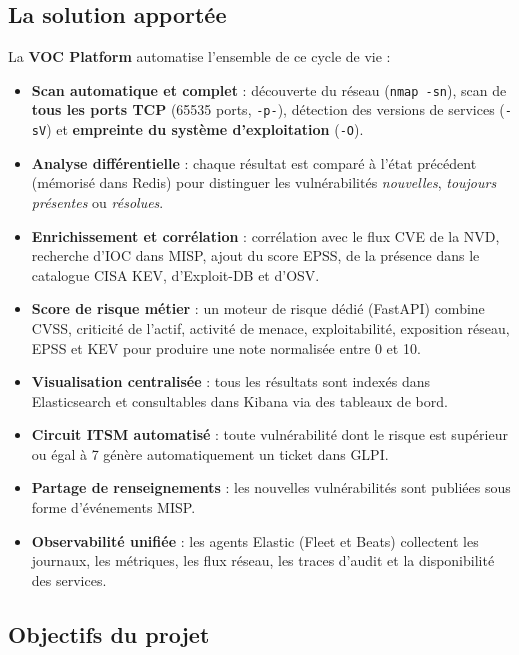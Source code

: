 \documentclass[11pt,a4paper]{article}
\begin{document}
\subsection{La solution apport\'ee}

La \textbf{VOC Platform} automatise l'ensemble de ce cycle de vie :

\begin{itemize}[leftmargin=1.6em]
  \item \textbf{Scan automatique et complet} : d\'ecouverte du r\'eseau
        (\texttt{nmap -sn}), scan de \textbf{tous les ports TCP} (65535 ports,
        \texttt{-p-}), d\'etection des versions de services (\texttt{-sV}) et
        \textbf{empreinte du syst\`eme d'exploitation} (\texttt{-O}).
  \item \textbf{Analyse diff\'erentielle} : chaque r\'esultat est compar\'e
        \`a l'\'etat pr\'ec\'edent (m\'emoris\'e dans Redis) pour distinguer
        les vuln\'erabilit\'es \emph{nouvelles}, \emph{toujours pr\'esentes}
        ou \emph{r\'esolues}.
  \item \textbf{Enrichissement et corr\'elation} : corr\'elation avec le flux
        CVE de la NVD, recherche d'IOC dans MISP, ajout du score EPSS, de la
        pr\'esence dans le catalogue CISA KEV, d'Exploit-DB et d'OSV.
  \item \textbf{Score de risque m\'etier} : un moteur de risque d\'edi\'e
        (FastAPI) combine CVSS, criticit\'e de l'actif, activit\'e de menace,
        exploitabilit\'e, exposition r\'eseau, EPSS et KEV pour produire une
        note normalis\'ee entre 0 et 10.
  \item \textbf{Visualisation centralis\'ee} : tous les r\'esultats sont
        index\'es dans Elasticsearch et consultables dans Kibana via des
        tableaux de bord.
  \item \textbf{Circuit ITSM automatis\'e} : toute vuln\'erabilit\'e dont le
        risque est sup\'erieur ou \'egal \`a 7 g\'en\`ere automatiquement un
        ticket dans GLPI.
  \item \textbf{Partage de renseignements} : les nouvelles vuln\'erabilit\'es
        sont publi\'ees sous forme d'\'ev\'enements MISP.
  \item \textbf{Observabilit\'e unifi\'ee} : les agents Elastic (Fleet et
        Beats) collectent les journaux, les m\'etriques, les flux r\'eseau,
        les traces d'audit et la disponibilit\'e des services.
\end{itemize}

\subsection{Objectifs du projet}
\end{document}
